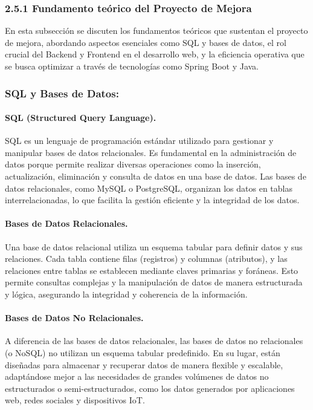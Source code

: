 \subsubsection{2.5.1 Fundamento teórico del Proyecto de Mejora}
En esta subsección se discuten los fundamentos teóricos que sustentan el proyecto de mejora, abordando aspectos esenciales como SQL y bases de datos, el rol crucial del Backend y Frontend en el desarrollo web, y la eficiencia operativa que se busca optimizar a través de tecnologías como Spring Boot y Java.

\subsubsection{SQL y Bases de Datos:}
\paragraph{SQL (Structured Query Language). }
SQL es un lenguaje de programación estándar utilizado para gestionar y manipular bases de datos relacionales. Es fundamental en la administración de datos porque permite realizar diversas operaciones como la inserción, actualización, eliminación y consulta de datos en una base de datos. Las bases de datos relacionales, como MySQL o PostgreSQL, organizan los datos en tablas interrelacionadas, lo que facilita la gestión eficiente y la integridad de los datos.

\paragraph{Bases de Datos Relacionales.}
Una base de datos relacional utiliza un esquema tabular para definir datos y sus relaciones. Cada tabla contiene filas (registros) y columnas (atributos), y las relaciones entre tablas se establecen mediante claves primarias y foráneas. Esto permite consultas complejas y la manipulación de datos de manera estructurada y lógica, asegurando la integridad y coherencia de la información.

\paragraph{Bases de Datos No Relacionales.}
A diferencia de las bases de datos relacionales, las bases de datos no relacionales (o NoSQL) no utilizan un esquema tabular predefinido. En su lugar, están diseñadas para almacenar y recuperar datos de manera flexible y escalable, adaptándose mejor a las necesidades de grandes volúmenes de datos no estructurados o semi-estructurados, como los datos generados por aplicaciones web, redes sociales y dispositivos IoT.

